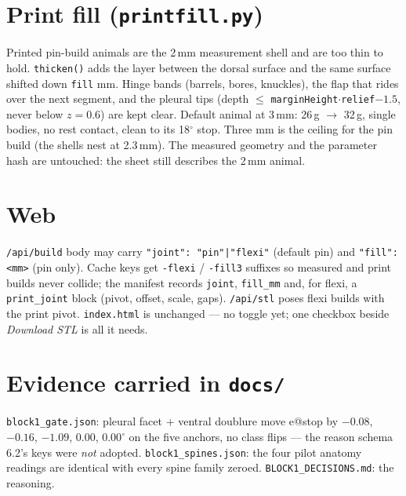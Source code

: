 \documentclass[11pt]{article}
\newcommand{\code}[1]{\texttt{#1}}
\begin{document}
\section{Print fill (\code{printfill.py})}
Printed pin-build animals are the 2\,mm measurement shell and are too thin to hold. \code{thicken()} adds the layer between the dorsal surface and the same surface shifted down \code{fill} mm. Hinge bands (barrels, bores, knuckles), the flap that rides over the next segment, and the pleural tips (depth \(\le\) \code{marginHeight}\(\cdot\)\code{relief}\(-1.5\), never below \(z=0.6\)) are kept clear. Default animal at 3\,mm: 26\,g \(\to\) 32\,g, single bodies, no rest contact, clean to its 18\(^\circ\) stop. Three mm is the ceiling for the pin build (the shells nest at 2.3\,mm). The measured geometry and the parameter hash are untouched: the sheet still describes the 2\,mm animal.

\section{Web}
\code{/api/build} body may carry \code{"joint": "pin"|"flexi"} (default pin) and \code{"fill": <mm>} (pin only). Cache keys get \code{-flexi} / \code{-fill3} suffixes so measured and print builds never collide; the manifest records \code{joint}, \code{fill\_mm} and, for flexi, a \code{print\_joint} block (pivot, offset, scale, gaps). \code{/api/stl} poses flexi builds with the print pivot. \code{index.html} is unchanged --- no toggle yet; one checkbox beside \emph{Download STL} is all it needs.

\section{Evidence carried in \code{docs/}}
\code{block1\_gate.json}: pleural facet + ventral doublure move e@stop by \(-0.08\), \(-0.16\), \(-1.09\), \(0.00\), \(0.00^\circ\) on the five anchors, no class flips --- the reason schema 6.2's keys were \emph{not} adopted. \code{block1\_spines.json}: the four pilot anatomy readings are identical with every spine family zeroed. \code{BLOCK1\_DECISIONS.md}: the reasoning.
\end{document}
